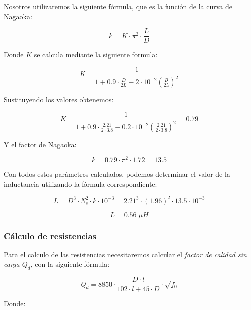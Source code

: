 Nosotros utilizaremos la siguiente fórmula, que es la función de la curva de Nagaoka:

\begin{equation}
    k = K \cdot \pi^2 \cdot \frac{L}{D} 
\end{equation}

Donde $K$ se calcula mediante la siguiente formula:

\begin{equation}
    K = \frac{1}{1 + 0.9 \cdot \frac{D}{2L} - 2 \cdot 10^{-2} \left(\frac{D}{2L}\right)^2}
\end{equation}

Sustituyendo los valores obtenemos:

\begin{equation}
    K = \frac{1}{1 + 0.9 \cdot \frac{2.21}{2 \cdot 3.8} - 0.2 \cdot 10^{-2} \left(\frac{2.21}{2 \cdot 3.8}\right)^2} = 0.79
\end{equation}

Y el factor de Nagaoka:

\begin{equation}
    k = 0.79 \cdot \pi^2 \cdot 1.72 = 13.5
\end{equation}


Con todos estos parámetros calculados, podemos determinar el valor de la inductancia utilizando la fórmula correspondiente:

\begin{equation}
    L = D^3 \cdot N_s^2 \cdot k \cdot 10^{-3} = 2.21^3 \cdot (1.96)^2 \cdot 13.5 \cdot 10^{-3} 
\end{equation}

\begin{equation}
    \boxed{L = 0.56\; \mu H}
\end{equation}

\subsubsection{Cálculo de resistencias}

Para el calculo de las resistencias necesitaremos calcular el \textit{factor de calidad sin carga $Q_d$}, con la siguiente fórmula:

\begin{equation}
    Q_d = 8850 \cdot \frac{D \cdot l}{102 \cdot l + 45 \cdot D} \cdot \sqrt{f_0}
\end{equation}

Donde:

